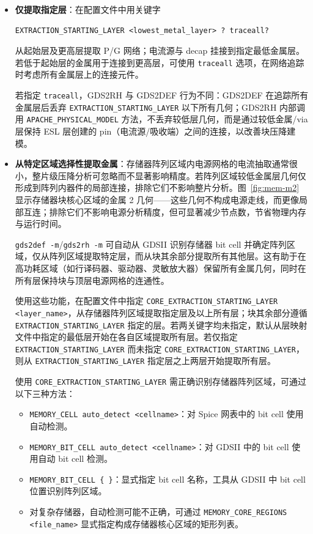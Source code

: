 \begin{itemize}
  \item \textbf{仅提取指定层}：在配置文件中用关键字
\begin{lstlisting}
EXTRACTION_STARTING_LAYER <lowest_metal_layer> ? traceall?
\end{lstlisting}
  从起始层及更高层提取 P/G 网络；电流源与 decap 挂接到指定最低金属层。若低于起始层的金属用于连接到更高层，可使用 \texttt{traceall} 选项，在网络追踪时考虑所有金属层上的连接元件。

  \begin{noteBox}
  若指定 \texttt{traceall}，GDS2RH 与 GDS2DEF 行为不同：GDS2DEF 在追踪所有金属层后丢弃 \texttt{EXTRACTION\_STARTING\_LAYER} 以下所有几何；GDS2RH 内部调用 \texttt{APACHE\_PHYSICAL\_MODEL} 方法，不丢弃较低层几何，而是通过较低金属/via 层保持 ESL 层创建的 pin（电流源/吸收端）之间的连接，以改善块压降建模。
  \end{noteBox}

  \item \textbf{从特定区域选择性提取金属}：存储器阵列区域内电源网格的电流抽取通常很小，整片级压降分析可忽略而不显著影响精度。若阵列区域较低金属层几何仅形成到阵列内器件的局部连接，排除它们不影响整片分析。图~\ref{fig:mem-m2} 显示存储器块核心区域的金属 2 几何——这些几何不构成电源走线，而更像局部互连；排除它们不影响电源分析精度，但可显著减少节点数，节省物理内存与运行时间。


  \texttt{gds2def -m}/\texttt{gds2rh -m} 可自动从 GDSII 识别存储器 bit cell 并确定阵列区域，仅从阵列区域提取特定层，而从块其余部分提取所有其他层。这有助于在高功耗区域（如行译码器、驱动器、灵敏放大器）保留所有金属几何，同时在所有层保持块与顶层电源网格的连通性。

  使用这些功能，在配置文件中指定 \texttt{CORE\_EXTRACTION\_STARTING\_LAYER <layer\_name>}，从存储器阵列区域提取指定层及以上所有层；块其余部分遵循 \texttt{EXTRACTION\_STARTING\_LAYER} 指定的层。若两关键字均未指定，默认从层映射文件中指定的最低层开始在各自区域提取所有层。若仅指定 \texttt{EXTRACTION\_STARTING\_LAYER} 而未指定 \texttt{CORE\_EXTRACTION\_STARTING\_LAYER}，则从 \texttt{EXTRACTION\_STARTING\_LAYER} 指定层之上两层开始提取所有层。

  使用 \texttt{CORE\_EXTRACTION\_STARTING\_LAYER} 需正确识别存储器阵列区域，可通过以下三种方法：
  \begin{itemize}
    \item \texttt{MEMORY\_CELL auto\_detect <cellname>}：对 Spice 网表中的 bit cell 使用自动检测。
    \item \texttt{MEMORY\_BIT\_CELL auto\_detect <cellname>}：对 GDSII 中的 bit cell 使用自动 bit cell 检测。
    \item \texttt{MEMORY\_BIT\_CELL \{ \}}：显式指定 bit cell 名称，工具从 GDSII 中 bit cell 位置识别阵列区域。
    \item 对复杂存储器，自动检测可能不正确，可通过 \texttt{MEMORY\_CORE\_REGIONS <file\_name>} 显式指定构成存储器核心区域的矩形列表。
  \end{itemize}


\end{itemize}
